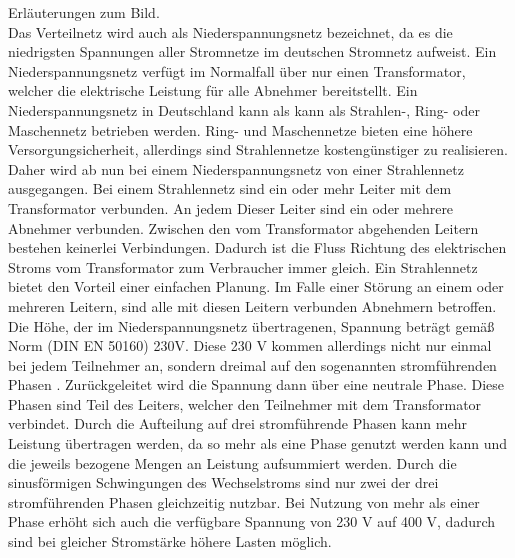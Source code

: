 Erläuterungen zum Bild. \\
Das Verteilnetz wird auch als Niederspannungsnetz bezeichnet, da es die niedrigsten Spannungen aller Stromnetze im deutschen Stromnetz aufweist. Ein Niederspannungsnetz verfügt im Normalfall über nur einen Transformator, welcher die elektrische Leistung für alle Abnehmer bereitstellt. Ein Niederspannungsnetz in Deutschland kann als kann als Strahlen-, Ring- oder Maschennetz betrieben werden. Ring- und Maschennetze bieten eine höhere Versorgungsicherheit, allerdings sind Strahlennetze kostengünstiger zu realisieren. Daher wird ab nun bei einem Niederspannungsnetz von einer Strahlennetz ausgegangen. Bei einem Strahlennetz sind ein oder mehr Leiter mit dem Transformator verbunden. An jedem Dieser Leiter sind ein oder mehrere Abnehmer verbunden. Zwischen den vom Transformator abgehenden Leitern bestehen keinerlei Verbindungen. Dadurch ist die Fluss Richtung des elektrischen Stroms vom Transformator zum Verbraucher immer gleich. Ein Strahlennetz bietet den Vorteil einer einfachen Planung. Im Falle einer Störung an einem oder mehreren Leitern, sind alle mit diesen Leitern verbunden Abnehmern betroffen.\\
Die Höhe, der im Niederspannungsnetz übertragenen, Spannung beträgt gemäß Norm (DIN EN 50160) 230V.  Diese 230 V kommen allerdings nicht nur einmal bei jedem Teilnehmer an, sondern dreimal auf den sogenannten stromführenden Phasen \cite{strom_phasen}. Zurückgeleitet wird die Spannung dann über eine neutrale Phase. Diese Phasen sind Teil des Leiters, welcher den Teilnehmer mit dem Transformator verbindet. Durch die Aufteilung auf drei stromführende Phasen kann mehr Leistung übertragen werden, da so mehr als eine Phase genutzt werden kann und die jeweils bezogene Mengen an Leistung aufsummiert werden. Durch die sinusförmigen Schwingungen des Wechselstroms sind nur zwei der drei stromführenden Phasen gleichzeitig nutzbar. Bei Nutzung von mehr als einer Phase erhöht sich auch die verfügbare Spannung von 230 V auf 400 V, dadurch sind bei gleicher Stromstärke höhere Lasten möglich.



